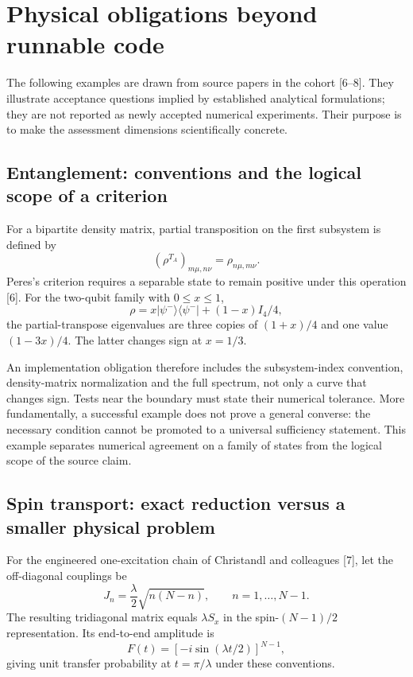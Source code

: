 \documentclass[10pt,a4paper]{article}
\begin{document}
\section{Physical obligations beyond runnable
code}\label{physical-obligations-beyond-runnable-code}

The following examples are drawn from source papers in the cohort
{[}6--8{]}. They illustrate acceptance questions implied by established
analytical formulations; they are not reported as newly accepted
numerical experiments. Their purpose is to make the assessment
dimensions scientifically concrete.

\subsection{Entanglement: conventions and the logical scope of a
criterion}\label{entanglement-conventions-and-the-logical-scope-of-a-criterion}

For a bipartite density matrix, partial transposition on the first
subsystem is defined by \[
(\rho^{T_A})_{m\mu,n\nu}=\rho_{n\mu,m\nu}.
\] Peres's criterion requires a separable state to remain positive under
this operation {[}6{]}. For the two-qubit family with \(0\leq x\leq1\),
\[
\rho=x|\psi^-\rangle\langle\psi^-|+(1-x)I_4/4,
\] the partial-transpose eigenvalues are three copies of \((1+x)/4\) and
one value \((1-3x)/4\). The latter changes sign at \(x=1/3\).

An implementation obligation therefore includes the subsystem-index
convention, density-matrix normalization and the full spectrum, not only
a curve that changes sign. Tests near the boundary must state their
numerical tolerance. More fundamentally, a successful example does not
prove a general converse: the necessary condition cannot be promoted to
a universal sufficiency statement. This example separates numerical
agreement on a family of states from the logical scope of the source
claim.

\subsection{Spin transport: exact reduction versus a smaller physical
problem}\label{spin-transport-exact-reduction-versus-a-smaller-physical-problem}

For the engineered one-excitation chain of Christandl and colleagues
{[}7{]}, let the off-diagonal couplings be \[
J_n=\frac{\lambda}{2}\sqrt{n(N-n)},\qquad n=1,\ldots,N-1.
\] The resulting tridiagonal matrix equals \(\lambda S_x\) in the
spin-\((N-1)/2\) representation. Its end-to-end amplitude is \[
F(t)=\left[-i\sin(\lambda t/2)\right]^{N-1},
\] giving unit transfer probability at \(t=\pi/\lambda\) under these
conventions.
\end{document}
